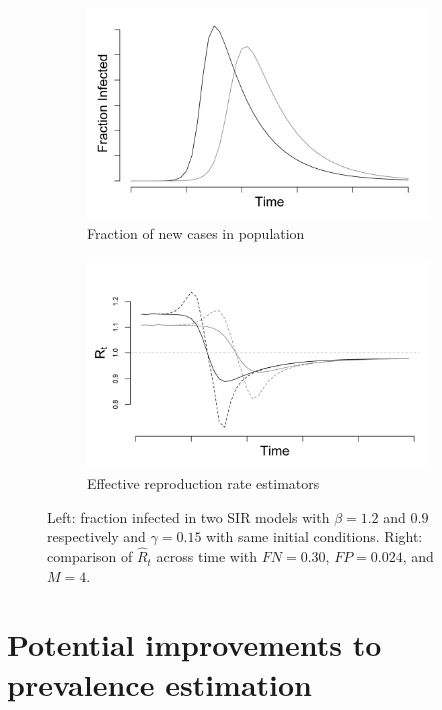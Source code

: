 \documentclass[11pt]{amsart}
\numberwithin{equation}{section}
\theoremstyle{plain}
\begin{document}
\begin{figure}
\centering
\begin{subfigure}{.5\textwidth}
 \centering
 \includegraphics[width=.9\linewidth]{../figs/sir.png}
 \caption{Fraction of new cases in population}
 \label{fig:fracpop}
\end{subfigure}%
\begin{subfigure}{.5\textwidth}
 \centering
 \includegraphics[width=.9\linewidth]{../figs/sir_rt_comparison.png}
 \caption{Effective reproduction rate estimators}
 \label{fig:eff}
\end{subfigure}
\caption{Left: fraction infected in two SIR models with $\beta = 1.2$ and $0.9$ respectively and $\gamma = 0.15$ with same initial conditions. Right: comparison of $\hat R_t$ across time with $FN = 0.30$, $FP = 0.024$, and $M = 4$.}
\label{fig:comparison}
\end{figure}

\section{Potential improvements to prevalence estimation}
\label{section:improvedcasecount}
\end{document}
